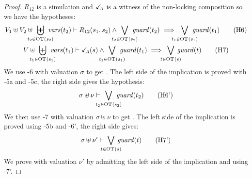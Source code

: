 \documentclass{article}
\begin{document}
\begin{proof}
	\(R_{12}\) is a simulation and \(\checkmark_{\!\! A}\) is a witness of the non-locking composition so we have the hypotheses:
	\begin{gather}
		V_1 \uplus V_2 \uplus \biguplus_\subbox{t_2 \in \fOT{s_2}} \fvars{t_2} \vdash R_{12}\mpar{s_1, s_2} \wedge \bigvee_\subbox{t_2 \in \fOT{s_2}} \fguard{t_2} \implies \bigvee_\subbox{t_1 \in \fOT{s_1}} \fguard{t_1} \hyp{6} \\
		V \uplus \biguplus_\subbox{t_1 \in \fOT{s_1}} \fvars{t_1} \vdash \reach{A}\mpar{s} \wedge \bigvee_\subbox{t_1 \in \fOT{s_1}} \fguard{t_1} \implies \bigvee_\subbox{t \in \fOT{s}} \fguard{t} \hyp{7}
	\end{gather}
	We use \hyp{6} with valuation \(\sigma\) to get .
	The left side of the implication is proved with \hyp{5a} and \hyp{5c}, the right side gives the hypothesis:
	\[ \sigma \uplus \nu \vdash \bigvee_\subbox{t_2 \in \fOT{s_2}} \fguard{t_2} \hyp{6'} \]
	We then use \hyp{7} with valuation \(\sigma \uplus \nu\) to get .
	The left side of the implication is proved using \hyp{5b} and \hyp{6'}, the right side gives:
	\[ \sigma \uplus \nu' \vdash \bigvee_\subbox{t \in \fOT{s}} \fguard{t} \hyp{7'} \]
	We prove  with valuation \(\nu'\) by admitting the left side of the implication and using \hyp{7'}.
\end{proof}
\end{document}
